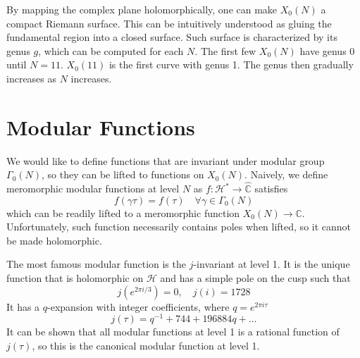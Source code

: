 \documentclass[]{article}
\begin{document}
By mapping the complex plane holomorphically, one can make $X_0(N)$ a compact Riemann surface. This can be intuitively understood as gluing the fundamental region into a closed surface. Such surface is characterized by its genus $g$, which can be computed for each $N$. The first few $X_0(N)$ have genus 0 until $N = 11$. $X_0(11)$ is the first curve with genus 1. The genus then gradually increases as $N$ increases.

\section{Modular Functions}

We would like to define functions that are invariant under modular group $\Gamma_0(N)$, so they can be lifted to functions on $X_0(N)$. Naively, we define meromorphic modular functions at level $N$ as $f:\mathcal{H}^*\to\hat{\mathbb{C}}$ satisfies
\[
f(\gamma\tau) = f(\tau)\quad \forall \gamma \in\Gamma_0(N) 
\]
which can be readily lifted to a meromorphic function $X_0(N)\to\mathbb{C}$. Unfortunately, such function necessarily contains poles when lifted, so it cannot be made holomorphic.

The most famous modular function is the $j$-invariant at level 1. It is the unique function that is holomorphic on $\mathcal{H}$ and has a simple pole on the cusp such that
\[
j(e^{2\pi i / 3}) = 0, \quad j(i) = 1728
\]
It has a $q$-expansion with integer coefficients, where $q = e^{2\pi i \tau}$
\[
j(\tau) = q^{-1} + 744 + 196884q + \dots
\]
It can be shown that all modular functions at level 1 is a rational function of $j(\tau)$, so this is the canonical modular function at level 1.
\end{document}
